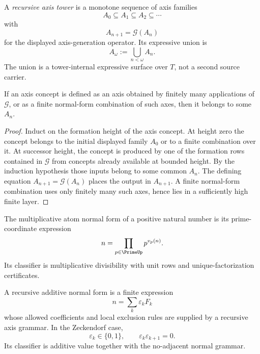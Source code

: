 \begin{definition}
\label{def:recursive-axis-tower}
A \emph{recursive axis tower} is a monotone sequence of axis families
$$
A_0\subseteq A_1\subseteq A_2\subseteq\cdots
$$
with
$$
A_{n+1}=\mathcal G(A_n)
$$
for the displayed axis-generation operator. Its expressive union is
$$
A_\omega:=\bigcup_{n<\omega}A_n.
$$
The union is a tower-internal expressive surface over $T$, not a second
source carrier.
\end{definition}

\begin{theorem}
\label{thm:relative-absence-tower-external-axes}
If an axis concept is defined as an axis obtained by finitely many
applications of $\mathcal G$, or as a finite normal-form combination of
such axes, then it belongs to some $A_n$.
\end{theorem}

\begin{proof}
Induct on the formation height of the axis concept. At height zero the
concept belongs to the initial displayed family $A_0$ or to a finite
combination over it. At successor height, the concept is produced by one
of the formation rows contained in $\mathcal G$ from concepts already
available at bounded height. By the induction hypothesis those inputs
belong to some common $A_n$. The defining equation
$A_{n+1}=\mathcal G(A_n)$ places the output in $A_{n+1}$. A finite
normal-form combination uses only finitely many such axes, hence lies in
a sufficiently high finite layer.
\end{proof}

\begin{definition}
\label{def:multiplicative-atom-normal-form}
The multiplicative atom normal form of a positive natural number is its
prime-coordinate expression
$$
n=\prod_{p\in\PrimeUp}p^{v_p(n)}.
$$
Its classifier is multiplicative divisibility with unit rows and
unique-factorization certificates.
\end{definition}

\begin{definition}
\label{def:recursive-additive-normal-form}
A recursive additive normal form is a finite expression
$$
n=\sum_k \varepsilon_kF_k
$$
whose allowed coefficients and local exclusion rules are supplied by a
recursive axis grammar. In the Zeckendorf case,
$$
\varepsilon_k\in\{0,1\},
\qquad
\varepsilon_k\varepsilon_{k+1}=0.
$$
Its classifier is additive value together with the no-adjacent normal
grammar.
\end{definition}

